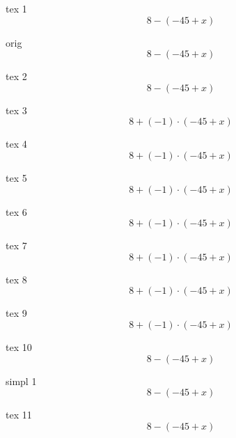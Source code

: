 \documentclass[a4paper, 12pt]{article}
\begin{document}
                          
tex 1 \[ {{8} - \left({{-45} + {x}}\right)} \]

orig \[ {{8} - \left({{-45} + {x}}\right)} \]

tex 2 \[ {{8} - \left({{-45} + {x}}\right)} \]

tex 3 \[ {{8} + {\left({-1}\right) \cdot \left({{-45} + {x}}\right)}} \]

tex 4 \[ {{8} + {\left({-1}\right) \cdot \left({{-45} + {x}}\right)}} \]

tex 5 \[ {{8} + {\left({-1}\right) \cdot \left({{-45} + {x}}\right)}} \]

tex 6 \[ {{8} + {\left({-1}\right) \cdot \left({{-45} + {x}}\right)}} \]

tex 7 \[ {{8} + {\left({-1}\right) \cdot \left({{-45} + {x}}\right)}} \]

tex 8 \[ {{8} + {\left({-1}\right) \cdot \left({{-45} + {x}}\right)}} \]

tex 9 \[ {{8} + {\left({-1}\right) \cdot \left({{-45} + {x}}\right)}} \]

tex 10 \[ {{8} - \left({{-45} + {x}}\right)} \]

simpl 1 \[ {{8} - \left({{-45} + {x}}\right)} \]

tex 11 \[ {{8} - \left({{-45} + {x}}\right)} \]
\end{document}

